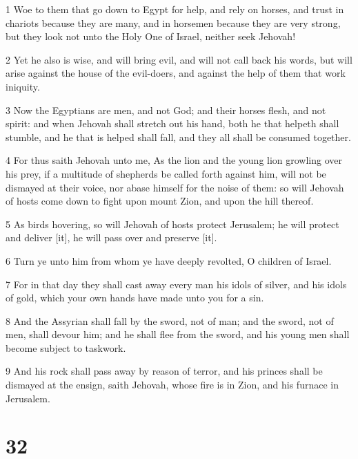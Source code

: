 \par 1 Woe to them that go down to Egypt for help, and rely on horses, and trust in chariots because they are many, and in horsemen because they are very strong, but they look not unto the Holy One of Israel, neither seek Jehovah!
\par 2 Yet he also is wise, and will bring evil, and will not call back his words, but will arise against the house of the evil-doers, and against the help of them that work iniquity.
\par 3 Now the Egyptians are men, and not God; and their horses flesh, and not spirit: and when Jehovah shall stretch out his hand, both he that helpeth shall stumble, and he that is helped shall fall, and they all shall be consumed together.
\par 4 For thus saith Jehovah unto me, As the lion and the young lion growling over his prey, if a multitude of shepherds be called forth against him, will not be dismayed at their voice, nor abase himself for the noise of them: so will Jehovah of hosts come down to fight upon mount Zion, and upon the hill thereof.
\par 5 As birds hovering, so will Jehovah of hosts protect Jerusalem; he will protect and deliver [it], he will pass over and preserve [it].
\par 6 Turn ye unto him from whom ye have deeply revolted, O children of Israel.
\par 7 For in that day they shall cast away every man his idols of silver, and his idols of gold, which your own hands have made unto you for a sin.
\par 8 And the Assyrian shall fall by the sword, not of man; and the sword, not of men, shall devour him; and he shall flee from the sword, and his young men shall become subject to taskwork.
\par 9 And his rock shall pass away by reason of terror, and his princes shall be dismayed at the ensign, saith Jehovah, whose fire is in Zion, and his furnace in Jerusalem.

\chapter{32}

